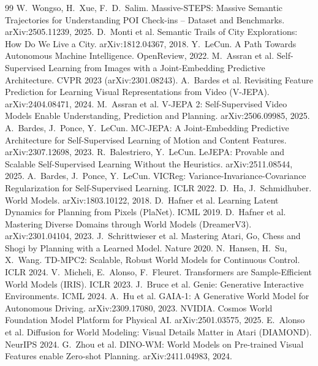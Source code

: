 \documentclass[10.5pt]{article}
\begin{document}
\begin{thebibliography}{99}\small
{} W.~Wongso, H.~Xue, F.~D.~Salim. Massive-STEPS: Massive Semantic Trajectories for Understanding POI Check-ins -- Dataset and Benchmarks. arXiv:2505.11239, 2025.
 D.~Monti et al. Semantic Trails of City Explorations: How Do We Live a City. arXiv:1812.04367, 2018.
 Y.~LeCun. A Path Towards Autonomous Machine Intelligence. OpenReview, 2022.
 M.~Assran et al. Self-Supervised Learning from Images with a Joint-Embedding Predictive Architecture. CVPR 2023 (arXiv:2301.08243).
 A.~Bardes et al. Revisiting Feature Prediction for Learning Visual Representations from Video (V-JEPA). arXiv:2404.08471, 2024.
 M.~Assran et al. V-JEPA 2: Self-Supervised Video Models Enable Understanding, Prediction and Planning. arXiv:2506.09985, 2025.
 A.~Bardes, J.~Ponce, Y.~LeCun. MC-JEPA: A Joint-Embedding Predictive Architecture for Self-Supervised Learning of Motion and Content Features. arXiv:2307.12698, 2023.
 R.~Balestriero, Y.~LeCun. LeJEPA: Provable and Scalable Self-Supervised Learning Without the Heuristics. arXiv:2511.08544, 2025.
 A.~Bardes, J.~Ponce, Y.~LeCun. VICReg: Variance-Invariance-Covariance Regularization for Self-Supervised Learning. ICLR 2022.
 D.~Ha, J.~Schmidhuber. World Models. arXiv:1803.10122, 2018.
 D.~Hafner et al. Learning Latent Dynamics for Planning from Pixels (PlaNet). ICML 2019.
 D.~Hafner et al. Mastering Diverse Domains through World Models (DreamerV3). arXiv:2301.04104, 2023.
 J.~Schrittwieser et al. Mastering Atari, Go, Chess and Shogi by Planning with a Learned Model. Nature 2020.
 N.~Hansen, H.~Su, X.~Wang. TD-MPC2: Scalable, Robust World Models for Continuous Control. ICLR 2024.
 V.~Micheli, E.~Alonso, F.~Fleuret. Transformers are Sample-Efficient World Models (IRIS). ICLR 2023.
 J.~Bruce et al. Genie: Generative Interactive Environments. ICML 2024.
 A.~Hu et al. GAIA-1: A Generative World Model for Autonomous Driving. arXiv:2309.17080, 2023.
 NVIDIA. Cosmos World Foundation Model Platform for Physical AI. arXiv:2501.03575, 2025.
 E.~Alonso et al. Diffusion for World Modeling: Visual Details Matter in Atari (DIAMOND). NeurIPS 2024.
 G.~Zhou et al. DINO-WM: World Models on Pre-trained Visual Features enable Zero-shot Planning. arXiv:2411.04983, 2024.

\end{thebibliography}
\end{document}
